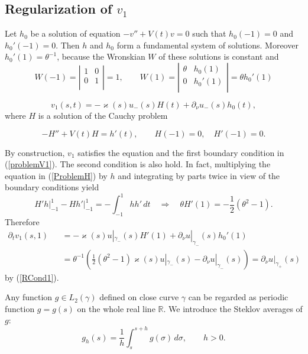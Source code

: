\documentclass[graybox]{svmult}
\renewcommand{\kappa}{\varkappa}
\newcommand{\Real}{\mathbb R}
\newcommand{\eqref}[1]{(\ref{#1})}
\begin{document}
\subsection{Regularization of $v_1$}

Let $h_0$ be a solution of equation $-v''+V(t)v=0$ such that $h_0(-1)=0$ and $h_0'(-1)=0$. Then $h$ and $h_0$ form a fundamental system of solutions. Moreover $h_0'(1)=\theta^{-1}$, because the Wronskian $W$ of these solutions is constant and
$$
 W(-1)=\left|
        \begin{array}{cc}
          1 & 0 \\
          0 & 1\\
        \end{array}
      \right|=1, \qquad
 W(1)=\left|
        \begin{array}{cc}
          \theta & h_0(1) \\
          0 & h_0'(1)\\
        \end{array}
      \right|=\theta h_0'(1)
$$


\begin{equation}\label{RepresentV1}
  v_1(s,t)=-\kappa(s) u_-(s)H(t)+\partial_\nu u_-(s)h_0(t),
\end{equation}
where $H$ is a solution of the Cauchy problem

\begin{equation}\label{ProblemH}
  -H''+V(t)H=h'(t), \qquad H(-1)=0, \quad H'(-1)=0.
\end{equation}

By construction, $v_1$ satisfies  the equation and the first boundary condition in \eqref{problemV1}. The second condition is also hold. In fact, multiplying the equation in \eqref{ProblemH} by $h$ and  integrating by parts twice  in view of the boundary conditions yield
$$
 H'h\big|_{-1}^1-Hh'\big|_{-1}^1=-\int_{-1}^1hh'\,dt\quad
\Rightarrow \quad \theta H'(1)=-\frac{1}{2 }(\theta^2-1).
$$
Therefore
\begin{eqnarray}\nonumber
\partial_t v_1(s,1)&&=-\kappa(s) u|_{\gamma_-}(s)H'(1)+\partial_\nu u|_{\gamma_-}(s)h_0'(1)\\\nonumber
&&=\theta^{-1} \left(\textstyle\frac{1}{2 }(\theta^2-1)\kappa(s) u|_{\gamma_-}(s)-\partial_\nu u|_{\gamma_-}(s)\right)=\partial_\nu u|_{\gamma_+}(s)
\end{eqnarray}
by \eqref{RCond1}.


Any function $g\in L_2(\gamma)$ defined on close curve $\gamma$ can be regarded as periodic function $g=g(s)$ on the whole real line $\Real$.
We introduce the Steklov averages of $g$:
$$
   g_h(s)=\frac{1}{h}\int_s^{s+h} g(\sigma)\,d\sigma, \qquad h>0.
$$
\end{document}
